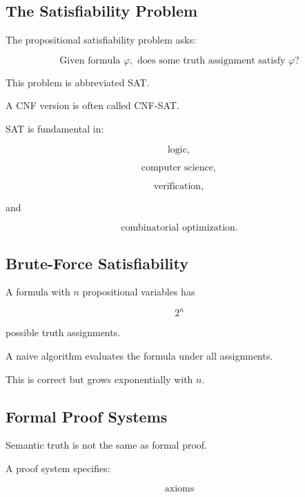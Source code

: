 \subsection{The Satisfiability Problem}
\label{subsec:sat-problem}

The propositional satisfiability problem asks:

\[
\boxed{
\text{Given formula }\varphi,
\text{ does some truth assignment satisfy }\varphi?
}
\]

This problem is abbreviated SAT.

A CNF version is often called CNF-SAT.

SAT is fundamental in:

\[
\boxed{
\text{logic},
}
\]

\[
\boxed{
\text{computer science},
}
\]

\[
\boxed{
\text{verification},
}
\]

and

\[
\boxed{
\text{combinatorial optimization}.
}
\]

\subsection{Brute-Force Satisfiability}
\label{subsec:brute-force-sat}

A formula with \(n\) propositional variables has

\[
\boxed{
2^n
}
\]

possible truth assignments.

A naive algorithm evaluates the formula under all assignments.

This is correct but grows exponentially with \(n\).

\subsection{Formal Proof Systems}
\label{subsec:formal-proof-systems}

Semantic truth is not the same as formal proof.

A proof system specifies:

\[
\boxed{
\text{axioms}
}
\]

